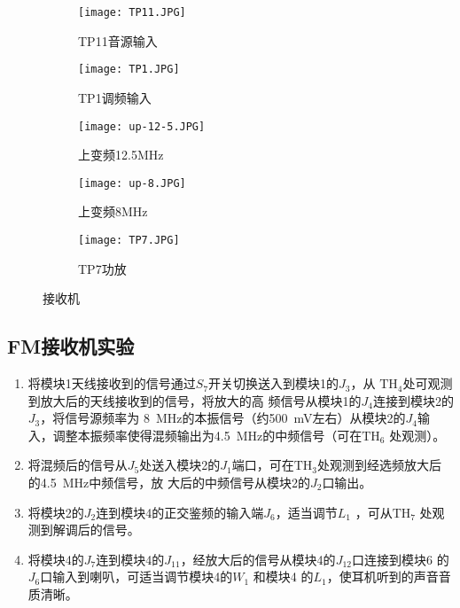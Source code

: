 \documentclass[../main]{subfiles}
\begin{document}
\begin{figure}[htbp]
	\centering
	\begin{subfigure}[htbp]{.45\linewidth}
		\centering
		\texttt{[image: TP11.JPG]}
		\caption{TP11音源输入}
		\label{fig:TP11音源输入}
	\end{subfigure}
	\quad
	\begin{subfigure}[htbp]{.45\linewidth}
		\centering
		\texttt{[image: TP1.JPG]}
		\caption{TP1调频输入}
		\label{fig:TP1调频输入}
	\end{subfigure}

	\begin{subfigure}[htbp]{.45\linewidth}
		\centering
		\texttt{[image: up-12-5.JPG]}
		\caption{上变频12.5MHz}
		\label{fig:上变频12.5MHz}
	\end{subfigure}
	\quad
	\begin{subfigure}[htbp]{.45\linewidth}
		\centering
		\texttt{[image: up-8.JPG]}
		\caption{上变频8MHz}
		\label{fig:上变频8MHz}
	\end{subfigure}

	\begin{subfigure}[htbp]{.45\linewidth}
		\centering
		\texttt{[image: TP7.JPG]}
		\caption{TP7功放}
		\label{fig:TP7功放}
	\end{subfigure}
	\caption{接收机}
	\label{fig:接收机}
\end{figure}

\subsection{FM接收机实验}%
\label{sub:FM接收机实验}

\begin{enumerate}

	\item 将模块1天线接收到的信号通过$ S_7 $开关切换送入到模块1的$ J_3 $，从
		$ \mathrm{TH}_4 $处可观测到放大后的天线接收到的信号，将放大的高
		频信号从模块1的$ J_4 $连接到模块2的$ J_3 $，将信号源频率为
		\SI{8}{\MHz}的本振信号（约\SI{500}{\mV}左右）从模块2的$ J_4 $输
		入，调整本振频率使得混频输出为\SI{4.5}{\MHz}的中频信号（可在$
		\mathrm{TH}_6 $ 处观测）。

	\item 将混频后的信号从$ J_5 $处送入模块2的$ J_1 $端口，可在$
		\mathrm{TH}_3 $处观测到经选频放大后的\SI{4.5}{\MHz}中频信号，放
		大后的中频信号从模块2的$ J_2 $口输出。

	\item 将模块2的$ J_2 $连到模块4的正交鉴频的输入端$ J_6 $，适当调节$ L_1
		$ ，可从$ \mathrm{TH}_7 $ 处观测到解调后的信号。

	\item 将模块4的$ J_7 $连到模块4的$ J_{11} $，经放大后的信号从模块4的$
		J_{12} $口连接到模块6 的$ J_6 $口输入到喇叭，可适当调节模块4的$
		W_1 $ 和模块4 的$ L_1 $，使耳机听到的声音音质清晰。

\end{enumerate}
\end{document}
